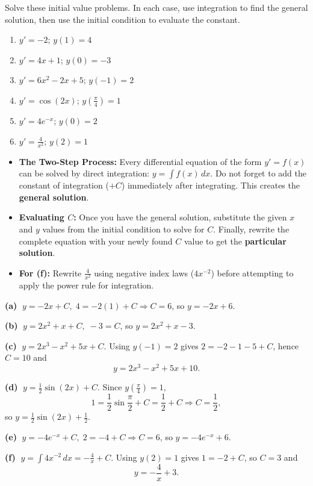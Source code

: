 \begin{problem}
Solve these initial value problems. In each case, use integration to find the general solution, then use the initial condition to evaluate the constant.

\begin{enumerate}
    \item[\textbf{a}] $y' = -2$; \qquad $y(1) = 4$
    \item[\textbf{b}] $y' = 4x + 1$; \qquad $y(0) = -3$
    \item[\textbf{c}] $y' = 6x^2 - 2x + 5$; \qquad $y(-1) = 2$
    \item[\textbf{d}] $y' = \cos(2x)$; \qquad $y\left(\frac{\pi}{4}\right) = 1$
    \item[\textbf{e}] $y' = 4e^{-x}$; \qquad $y(0) = 2$
    \item[\textbf{f}] $y' = \frac{4}{x^2}$; \qquad $y(2) = 1$
\end{enumerate}
\end{problem}

\begin{hint}
\begin{itemize}
    \item \textbf{The Two-Step Process:} Every differential equation of the form $y' = f(x)$ can be solved by direct integration: $y = \int f(x) \, dx$. Do not forget to add the constant of integration ($+ C$) immediately after integrating. This creates the \textbf{general solution}. 
    \item \textbf{Evaluating $C$:} Once you have the general solution, substitute the given $x$ and $y$ values from the initial condition to solve for $C$. Finally, rewrite the complete equation with your newly found $C$ value to get the \textbf{particular solution}.
    \item \textbf{For (f):} Rewrite $\frac{4}{x^2}$ using negative index laws ($4x^{-2}$) before attempting to apply the power rule for integration.
\end{itemize}
\end{hint}

\begin{solution}
\textbf{(a)} $\;y=-2x+C,\; 4=-2(1)+C \Rightarrow C=6$, so $\boxed{y=-2x+6}$.

\textbf{(b)} $\;y=2x^2+x+C,\; -3=C$, so $\boxed{y=2x^2+x-3}$.

\textbf{(c)} $\;y=2x^3-x^2+5x+C$. Using $y(-1)=2$ gives $2=-2-1-5+C$, hence $C=10$ and
\[
\boxed{y=2x^3-x^2+5x+10}.
\]

\textbf{(d)} $\;y=\frac12\sin(2x)+C$. Since $y\!\left(\frac{\pi}{4}\right)=1$,
\[
1=\frac12\sin\frac{\pi}{2}+C=\frac12+C \Rightarrow C=\frac12,
\]
so $\boxed{y=\frac12\sin(2x)+\frac12}$.

\textbf{(e)} $\;y=-4e^{-x}+C,\; 2=-4+C \Rightarrow C=6$, so $\boxed{y=-4e^{-x}+6}$.

\textbf{(f)} $\;y=\int4x^{-2}\,dx=-\frac4x+C$. Using $y(2)=1$ gives $1=-2+C$, so $C=3$ and
\[
\boxed{y=-\frac4x+3}.
\]
\end{solution}

